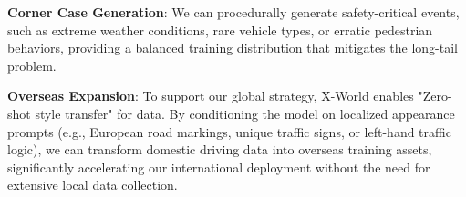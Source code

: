 \textbf{Corner Case Generation}: We can procedurally generate safety-critical events, such as extreme weather conditions, rare vehicle types, or erratic pedestrian behaviors, providing a balanced training distribution that mitigates the long-tail problem.

\textbf{Overseas Expansion}: To support our global strategy, X-World enables "Zero-shot style transfer" for data. By conditioning the model on localized appearance prompts (e.g., European road markings, unique traffic signs, or left-hand traffic logic), we can transform domestic driving data into overseas training assets, significantly accelerating our international deployment without the need for extensive local data collection.



